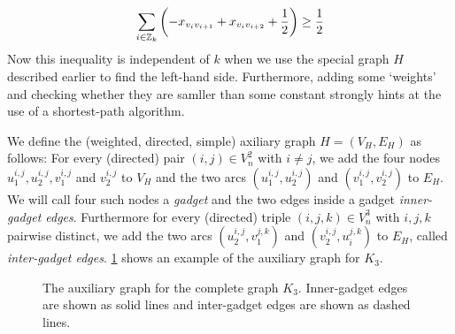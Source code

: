 \begin{equation*}
	\sum_{i \in \mathbb{Z}_k} \left( -x_{v_i v_{i+1}} + x_{v_i v_{i+2}} + \frac{1}{2} \right) \geq \frac{1}{2}
\end{equation*}
Now this inequality is independent of $k$ when we use the special graph $H$ described earlier to find the left-hand side.
Furthermore, adding some ‘weights’ and checking whether they are samller than some constant strongly hints at the use of a shortest-path algorithm.

We define the (weighted, directed, simple) axiliary graph $H = (V_{H}, E_{H})$ as follows:
For every (directed) pair $(i,j) \in V_{n}^{2}$ with $i \neq j$, we add the four nodes $u_{1}^{i,j}, u_{2}^{i,j}, v_{1}^{i,j}$ and $v_{2}^{i,j}$ to $V_{H}$ 
and the two arcs $(u_{1}^{i,j}, u_{2}^{i,j})$ and $(v_{1}^{i,j}, v_{2}^{i,j})$ to $E_{H}$.
We will call four such nodes a \textit{gadget} and the two edges inside a gadget \textit{inner-gadget edges}.
Furthermore for every (directed) triple $(i,j,k) \in V_{n}^{3}$ with $i,j,k$ pairwise distinct, we add the two arcs $(u_{2}^{i,j}, v_{1}^{j,k})$ and $(v_{2}^{i,j}, u_{i}^{j,k})$ to $E_{H}$, called \textit{inter-gadget edges}.
\cref{fig:aux_graph_K3} shows an example of the auxiliary graph for $K_{3}$.

\begin{figure}[H]
	\centering
	\caption[Auxiliary graph $H$ for $K_3$]{The auxiliary graph for the complete graph $K_{3}$.
	Inner-gadget edges are shown as solid lines and inter-gadget edges are shown as dashed lines.}
	\label{fig:aux_graph_K3}
\end{figure}

